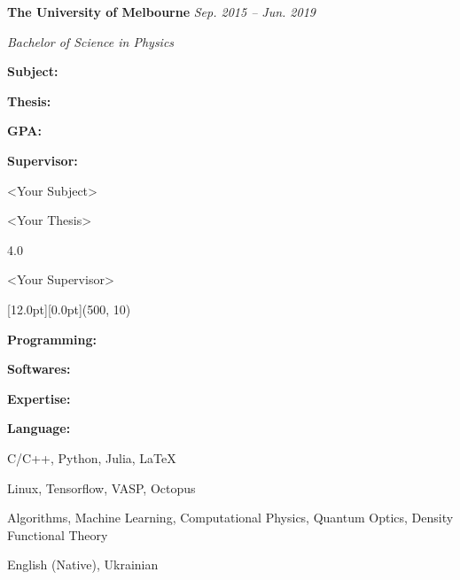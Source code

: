\documentclass[12pt,a4paper]{report}
\begin{document}
    \begin{center}\begin{minipage}[t]{460pt}
        \textbf{The University of Melbourne} \hfill{\em{Sep. 2015 -- Jun. 2019}}\par
        \vspace{4pt}\quad\em{Bachelor of Science in Physics}
    \end{minipage}\end{center}
    \begin{center}
        \begin{minipage}[t]{120pt}
            \quad \textbf{Subject:} \par
            \quad \textbf{Thesis:} \par
            \quad \textbf{GPA:} \par
            \quad \textbf{Supervisor:} \par
        \end{minipage}
        \begin{minipage}[t]{340pt}
            \textless Your Subject\textgreater \par
            \textless Your Thesis\textgreater \par
            4.0 \par
            \textless Your Supervisor\textgreater  \par
        \end{minipage}
    \end{center}
\begin{center}\begin{minipage}[t]{512pt}
    \colorbox{subtitlecolor}{\raisebox{0pt}[12.0pt][0.0pt]{\makebox(500, 10){
        \textcolor{white}{\ttfamily{}\selectfont{}}}}}\end{minipage}\end{center}
    \begin{center}
        \begin{minipage}[t]{120pt}
            \textbf{Programming:} \par
            \textbf{Softwares:} \par
            \textbf{Expertise:} \par
            \par
            \textbf{Language:} \par
        \end{minipage}
        \begin{minipage}[t]{340pt}
            C/C++, Python, Julia, \LaTeX \par
            Linux, Tensorflow, VASP, Octopus \par
            Algorithms, Machine Learning, Computational Physics, Quantum Optics, Density Functional Theory  \par
            English (Native), Ukrainian \par
        \end{minipage}
    \end{center}
\end{document}
